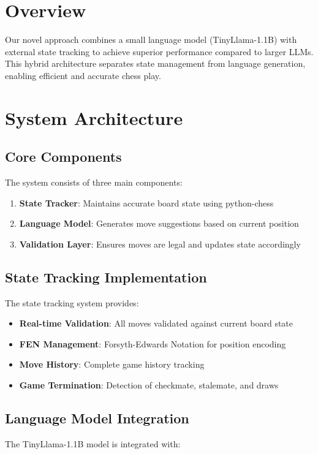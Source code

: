 \documentclass[11pt,a4paper]{report}
\begin{document}
\section{Overview}
Our novel approach combines a small language model (TinyLlama-1.1B) with external state tracking to achieve superior performance compared to larger LLMs. This hybrid architecture separates state management from language generation, enabling efficient and accurate chess play.

\section{System Architecture}

\subsection{Core Components}
The system consists of three main components:

\begin{enumerate}
    \item \textbf{State Tracker}: Maintains accurate board state using python-chess
    \item \textbf{Language Model}: Generates move suggestions based on current position
    \item \textbf{Validation Layer}: Ensures moves are legal and updates state accordingly
\end{enumerate}

\subsection{State Tracking Implementation}
The state tracking system provides:

\begin{itemize}
    \item \textbf{Real-time Validation}: All moves validated against current board state
    \item \textbf{FEN Management}: Forsyth-Edwards Notation for position encoding
    \item \textbf{Move History}: Complete game history tracking
    \item \textbf{Game Termination}: Detection of checkmate, stalemate, and draws
\end{itemize}

\subsection{Language Model Integration}
The TinyLlama-1.1B model is integrated with:
\end{document}
